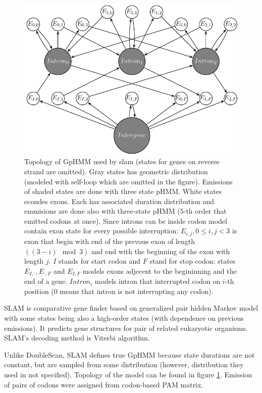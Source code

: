 \begin{figure}
\begin{center}
\includegraphics{../figures/slam.pdf}
\end{center}
\caption[HMM topology of SLAM's GpHMM]{
Topology of GpHMM used by slam (states for genes on reverse strand are omitted).
Gray states has geometric distribution (modeled with self-loop which are omitted
in the figure). Emissions of shaded states are done with three state pHMM. White
states econdes exons. Each has associated duration distribution and emmisions
are done also with three-state pHMM ($5$-th order that emitted codons at once).
Since introns can be inside codon model contain exon state for every possible
interruption: $E_{i,j},0\leq i,j<3$ is exon that begin with end of the prevous
exon of length $((3-i)\mod 3)$ and end with the beginning of the exon with
length $j$. $I$ stands for start codon and $F$ stand for stop codon: states
$E_{I,\cdot},E_{\cdot,F}$ and $E_{I,F}$ models exons adjecent to the begininning
and the end of a gene.  $Intron_i$ models intron that interrupted codon on
$i$-th position ($0$ means that intron is not interrupting any codon).
}\label{FIGURE:SLAM} \end{figure}

SLAM \cite{SLAM2003}  is comparative gene finder based on generalized pair
hidden Markov model \cite{Alexanderson2004} with some states being also a
high-order states (with dependence on previous emissions).  It predicts gene
structures for pair of related eukaryotic organisms. SLAM's decoding method is
Viterbi algorithm. 

Unlike DoubleScan, SLAM defines true GpHMM because state durations are not
constant, but are sampled from some distribution (however, distribution they
used in not specified). Topology of the model can be found in figure
\ref{FIGURE:SLAM}.
Emission of pairs of codons were assigned from codon-based PAM matrix.


